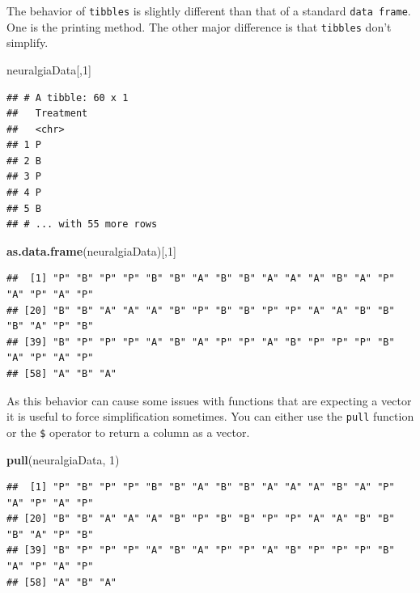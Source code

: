 \documentclass[
]{book}
\newenvironment{Shaded}{\begin{snugshade}}{\end{snugshade}}
\newcommand{\DecValTok}[1]{\textcolor[rgb]{0.00,0.00,0.81}{#1}}
\newcommand{\KeywordTok}[1]{\textcolor[rgb]{0.13,0.29,0.53}{\textbf{#1}}}
\newcommand{\NormalTok}[1]{#1}
\theoremstyle{definition}
\theoremstyle{definition}
\theoremstyle{definition}
\theoremstyle{remark}
\begin{document}
The behavior of \texttt{tibbles} is slightly different than that of a standard \texttt{data\ frame}. One is the printing method. The other major difference is that \texttt{tibbles} don't simplify.

\begin{Shaded}
\begin{Highlighting}[]
\NormalTok{neuralgiaData[,}\DecValTok{1}\NormalTok{]}
\end{Highlighting}
\end{Shaded}

\begin{verbatim}
## # A tibble: 60 x 1
##   Treatment
##   <chr>    
## 1 P        
## 2 B        
## 3 P        
## 4 P        
## 5 B        
## # ... with 55 more rows
\end{verbatim}

\begin{Shaded}
\begin{Highlighting}[]
\KeywordTok{as.data.frame}\NormalTok{(neuralgiaData)[,}\DecValTok{1}\NormalTok{]}
\end{Highlighting}
\end{Shaded}

\begin{verbatim}
##  [1] "P" "B" "P" "P" "B" "B" "A" "B" "B" "A" "A" "A" "B" "A" "P" "A" "P" "A" "P"
## [20] "B" "B" "A" "A" "A" "B" "P" "B" "B" "P" "P" "A" "A" "B" "B" "B" "A" "P" "B"
## [39] "B" "P" "P" "P" "A" "B" "A" "P" "P" "A" "B" "P" "P" "P" "B" "A" "P" "A" "P"
## [58] "A" "B" "A"
\end{verbatim}

As this behavior can cause some issues with functions that are expecting a vector it is useful to force simplification sometimes. You can either use the \texttt{pull} function or the \texttt{\$} operator to return a column as a vector.

\begin{Shaded}
\begin{Highlighting}[]
\KeywordTok{pull}\NormalTok{(neuralgiaData, }\DecValTok{1}\NormalTok{)}
\end{Highlighting}
\end{Shaded}

\begin{verbatim}
##  [1] "P" "B" "P" "P" "B" "B" "A" "B" "B" "A" "A" "A" "B" "A" "P" "A" "P" "A" "P"
## [20] "B" "B" "A" "A" "A" "B" "P" "B" "B" "P" "P" "A" "A" "B" "B" "B" "A" "P" "B"
## [39] "B" "P" "P" "P" "A" "B" "A" "P" "P" "A" "B" "P" "P" "P" "B" "A" "P" "A" "P"
## [58] "A" "B" "A"
\end{verbatim}
\end{document}

